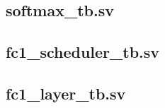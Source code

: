 \subsection{softmax\_tb.sv}

\pagebreak

\subsection{fc1\_scheduler\_tb.sv}

\pagebreak

\subsection{fc1\_layer\_tb.sv}

\pagebreak







